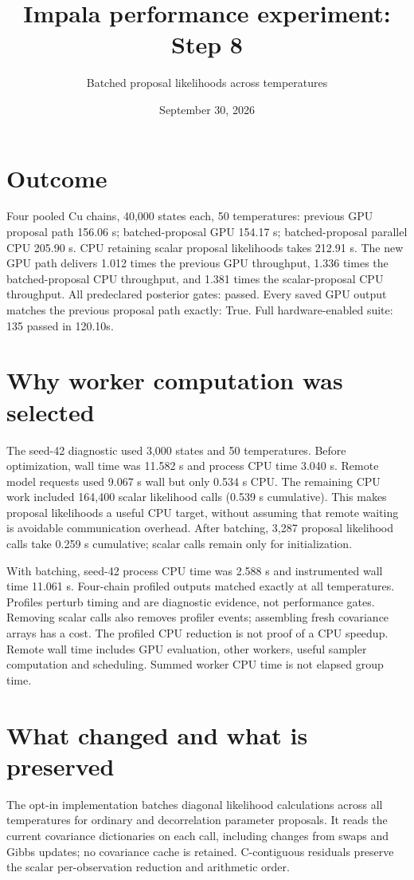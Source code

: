 \documentclass[11pt]{article}
\title{Impala performance experiment: Step 8}
\author{Batched proposal likelihoods across temperatures}
\date{September 30, 2026}
\begin{document}
\maketitle
\section*{Outcome}
Four pooled Cu chains, 40,000 states each, 50 temperatures: previous GPU proposal
path 156.06 s; batched-proposal GPU 154.17 s; batched-proposal parallel CPU 205.90 s.
CPU retaining scalar proposal likelihoods takes 212.91 s.
The new GPU path delivers 1.012 times the previous GPU throughput, 1.336
times the batched-proposal CPU throughput, and 1.381 times the
scalar-proposal CPU throughput. All predeclared posterior gates: passed.
Every saved GPU output matches the previous proposal path exactly: True.
Full hardware-enabled suite: 135 passed in 120.10s.
\section*{Why worker computation was selected}
The seed-42 diagnostic used 3,000 states and 50 temperatures. Before optimization,
wall time was 11.582 s and process CPU time 3.040 s. Remote model requests
used 9.067 s wall but only 0.534 s CPU. The remaining CPU
work included 164,400 scalar likelihood calls (0.539 s cumulative).
This makes proposal likelihoods a useful CPU target, without assuming that
remote waiting is avoidable communication overhead. After batching, 3,287
proposal likelihood calls take 0.259 s cumulative; scalar calls remain only
for initialization.

With batching, seed-42 process CPU time was 2.588 s and instrumented wall
time 11.061 s. Four-chain profiled outputs matched exactly at all temperatures.
Profiles perturb timing and are diagnostic evidence, not performance gates.
Removing scalar calls also removes profiler events; assembling fresh covariance
arrays has a cost. The profiled CPU reduction is not proof of a CPU speedup.
Remote wall time includes GPU evaluation, other workers, useful sampler computation
and scheduling. Summed worker CPU time is not elapsed group time.
\section*{What changed and what is preserved}
The opt-in implementation batches diagonal likelihood calculations across
all temperatures for ordinary and decorrelation parameter proposals. It reads
the current covariance dictionaries on each call, including changes from swaps
and Gibbs updates; no covariance cache is retained. C-contiguous residuals
preserve the scalar per-observation reduction and arithmetic order.
\end{document}
